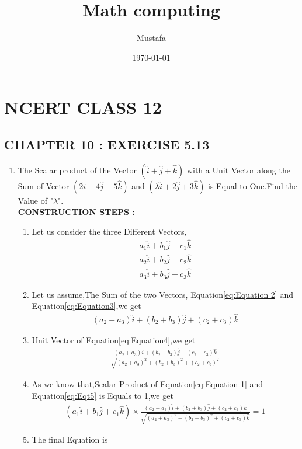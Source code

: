 \documentclass[11pt, a4paper]{article}
\title{ Math computing}
\author{ Mustafa}
\date{\today}
\begin{document}
\section*{NCERT CLASS 12}
\subsection*{CHAPTER 10 : EXERCISE 5.13}
\begin{enumerate}
\item The Scalar product of the Vector $(\hat{i}+\hat{j}+\hat{k})$ with a Unit Vector along the Sum of Vector $(2\hat{i}+4\hat{j}-5\hat{k})$ and $(\lambda \hat{i}+2\hat{j}+3\hat{k})$ is Equal to One.Find the Value of "$\lambda$". 
\\

\textbf{CONSTRUCTION STEPS :}
\begin{enumerate}
    \item Let us consider the three Different Vectors,
    \begin{align}
        a_1\hat{i}+b_1\hat{j}+c_1\hat{k} \label{eq:Equation 1}\\
                a_2\hat{i}+b_2\hat{j}+c_2\hat{k} \label{eq:Equation 2}\\
        a_3\hat{i}+b_3\hat{j}+c_3\hat{k} \label{eq:Equation3}
    \end{align}
     \item Let us assume,The Sum of the two Vectors, Equation\eqref{eq:Equation 2} and Equation\eqref{eq:Equation3},we get \begin{align}
         (a_2+a_3)\hat{i}+(b_2+b_3)\hat{j}+(c_2+c_3)\hat{k}\label{eq:Equation4}   
         \end{align}
     \item Unit Vector of Equation\eqref{eq:Equation4},we get
      \begin{align}
          \frac{(a_2+a_3)\hat{i}+(b_2+b_3)\hat{j}+(c_2+c_3)\hat{k}}{\sqrt{(a_2+a_3)^2+(b_2+b_3)^2+(c_2+c_3)^2}} \label{eq:Eqt5}
      \end{align}
      \item As we know that,Scalar Product of Equation\eqref{eq:Equation 1} and Equation\eqref{eq:Eqt5} is Equals to 1,we get
      \begin{align}
          (a_1\hat{i}+b_1\hat{j}+c_1\hat{k})\times\frac{(a_2+a_3)\hat{i}+(b_2+b_3)\hat{j}+(c_2+c_3)\hat{k}}{\sqrt{(a_2+a_3)^2+(b_2+b_3)^2+(c_2+c_3)\hat{k}}} = 1\label{eq:Eqt6}
      \end{align}
      \item The final Equation is 

\end{enumerate}
\end{enumerate}
\end{document}

